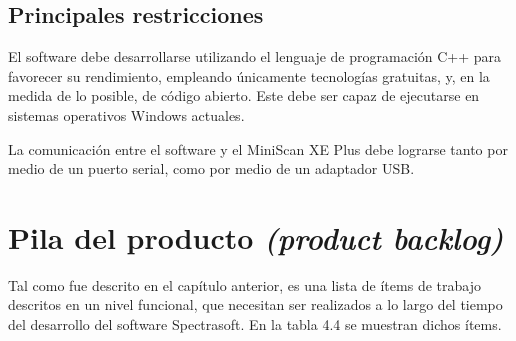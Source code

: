 	\subsection{Principales restricciones}
	
	El software debe desarrollarse utilizando el lenguaje de programaci\'{o}n C++ para favorecer su rendimiento, empleando \'{u}nicamente tecnolog\'{i}as gratuitas, y, en la medida de lo posible, de c\'{o}digo abierto. Este debe ser capaz de ejecutarse en sistemas operativos Windows actuales.
	
	La comunicaci\'{o}n entre el software y el MiniScan XE Plus debe lograrse tanto por medio de un puerto serial, como por medio de un adaptador USB.
	
\section{Pila del producto \textit{(product backlog)}}
	Tal como fue descrito en el cap\'{i}tulo anterior, es una lista de \'{i}tems de trabajo descritos en un nivel funcional, que necesitan ser realizados a lo largo del tiempo del desarrollo del software Spectrasoft. En la tabla 4.4 se muestran dichos \'{i}tems.
	

